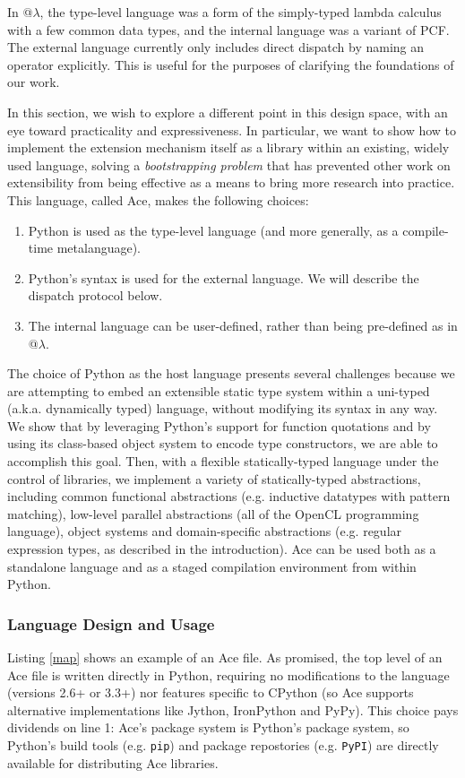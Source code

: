 In @$\lambda$, the type-level language was a form of the simply-typed lambda calculus with a few common data types, and the internal language was a variant of PCF. The external language currently only includes direct dispatch by naming an operator explicitly. This is useful for the purposes of clarifying the foundations of our work.

In this section, we wish to explore a different point in this design space, with an eye toward practicality and expressiveness. In particular, we want to show how to implement {the extension mechanism itself} as a library within an existing, widely used language, solving a \emph{bootstrapping problem} that has prevented  other work on extensibility from being effective as a means to bring more research into practice. This language, called Ace, makes the following choices:

\begin{enumerate}
\item Python is used as the type-level language (and more generally, as a compile-time metalanguage).
\item Python's syntax is used for the external language. We will describe the dispatch protocol below.
\item The internal language can be user-defined, rather than being pre-defined as in @$\lambda$.
\end{enumerate}

The choice of Python as the host language presents several challenges because we are attempting to embed an extensible static type system within a uni-typed (a.k.a. dynamically typed) language, without modifying its syntax in any way. We show that by leveraging Python's support for function quotations and by using its class-based object system to encode type constructors, we are able to accomplish this goal. Then, with a flexible statically-typed language under the control of libraries, we implement a variety of statically-typed abstractions, including common functional abstractions (e.g. inductive datatypes with pattern matching), low-level parallel abstractions (all of the OpenCL programming language), object systems and domain-specific abstractions (e.g. regular expression types, as described in the introduction). Ace can be used both as a standalone language and as a staged compilation environment from within Python.

\subsubsection{Language Design and Usage}\label{usage}
Listing \ref{map} shows an example of an Ace file. As promised, the top level of an Ace file is written directly in Python, requiring no modifications to the language (versions 2.6+ or 3.3+) nor features specific to CPython (so Ace supports alternative implementations like Jython, IronPython and PyPy). This choice pays  dividends on line 1: Ace's package system is Python's package system, so Python's build tools (e.g. \verb|pip|) and package repostories (e.g. \verb|PyPI|) are directly available for distributing Ace libraries. 

